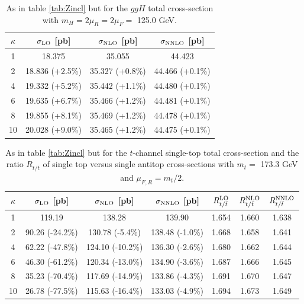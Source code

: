 \documentclass[letter,11pt]{article}
\def\k{\kappa}
\begin{document}
%
%
\begin{table}[t]
\centering
\vskip 1mm
\begin{tabular}{c|c|c|c}
$\k$ & $\sigma_{\rm LO}$ [pb] & $\sigma_{\rm NLO}$ [pb] & $\sigma_{\rm NNLO}$ [pb]\\
\hline
1  & 18.375 \phantom{(+0.7\%)} & 35.055 \phantom{(+0.7\%)} & 44.423 \phantom{(+0.7\%)} \\
2  & 18.836 (+2.5\%)           & 35.327 (+0.8\%)           & 44.466 (+0.1\%)           \\
4  & 19.332 (+5.2\%)           & 35.442 (+1.1\%)           & 44.480 (+0.1\%)           \\
6  & 19.635 (+6.7\%)           & 35.466 (+1.2\%)           & 44.481 (+0.1\%)           \\
8  & 19.855 (+8.1\%)           & 35.469 (+1.2\%)           & 44.478 (+0.1\%)           \\
10 & 20.028 (+9.0\%)           & 35.465 (+1.2\%)           & 44.475 (+0.1\%)           \\
\hline
 \end{tabular}
\caption{As in table \ref{tab:Zincl} but for the $ggH$ total cross-section with $m_H=2\mu_R=2\mu_F=$ 125.0 GeV.}
\label{tab:Hincl}
\end{table}
%
%
\begin{table}[t]
\centering
\vskip 1mm
\begin{tabular}{c| c c c |c c c}
$\k$ & $\sigma_{\rm LO}$ [pb] & $\sigma_{\rm NLO}$ [pb] & $\sigma_{\rm NNLO}$ [pb] & $R^{\rm LO}_{t/\bar{t}}$ &  $R^{\rm NLO}_{t/\bar{t}}$ & $R^{\rm NNLO}_{t/\bar{t}}$\\
\hline
1  & 119.19 \phantom{(+0.7\%)} & 138.28 \phantom{(+0.7\%)} & 139.90 \phantom{(+0.7\%)}  & 1.654 & 1.660 & 1.638 \\
2  &  90.26 (-24.2\%)          & 130.78 (-5.4\%)           & 138.48 (-1.0\%)    & 1.668 & 1.658 & 1.641       \\
4  &  62.22 (-47.8\%)          & 124.10 (-10.2\%)          & 136.30 (-2.6\%)   & 1.680 & 1.662 & 1.644       \\
6  &  46.30 (-61.2\%)          & 120.34 (-13.0\%)          & 134.90 (-3.6\%)   & 1.687 & 1.666 & 1.645        \\
8  &  35.23 (-70.4\%)          & 117.69 (-14.9\%)          & 133.86 (-4.3\%)   & 1.691 & 1.670 & 1.647       \\
10 &  26.78 (-77.5\%)          & 115.63 (-16.4\%)          & 133.03 (-4.9\%)  & 1.694 & 1.673 & 1.649         \\
\hline
\end{tabular}
\caption{As in table \ref{tab:Zincl} but for the $t$-channel single-top total cross-section and the ratio $R_{t/\bar{t}}$ of single top versus single antitop cross-sections with $m_t=$ 173.3 GeV and $\mu_{F,R}=m_t/2$.}
\label{tab:1tincl}
\end{table}
%
\end{document}
